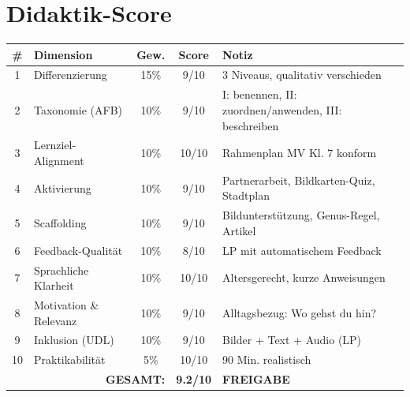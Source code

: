 \documentclass[11pt,a4paper]{article}
\begin{document}
\newpage
\section*{Didaktik-Score}

\begin{center}
\begin{tabular}{|c|l|c|c|p{5cm}|}
\hline
\textbf{\#} & \textbf{Dimension} & \textbf{Gew.} & \textbf{Score} & \textbf{Notiz} \\
\hline
1 & Differenzierung & 15\% & 9/10 & 3 Niveaus, qualitativ verschieden \\
\hline
2 & Taxonomie (AFB) & 10\% & 9/10 & I: benennen, II: zuordnen/anwenden, III: beschreiben \\
\hline
3 & Lernziel-Alignment & 10\% & 10/10 & Rahmenplan MV Kl. 7 konform \\
\hline
4 & Aktivierung & 10\% & 9/10 & Partnerarbeit, Bildkarten-Quiz, Stadtplan \\
\hline
5 & Scaffolding & 10\% & 9/10 & Bildunterstützung, Genus-Regel, Artikel \\
\hline
6 & Feedback-Qualität & 10\% & 8/10 & LP mit automatischem Feedback \\
\hline
7 & Sprachliche Klarheit & 10\% & 10/10 & Altersgerecht, kurze Anweisungen \\
\hline
8 & Motivation \& Relevanz & 10\% & 9/10 & Alltagsbezug: Wo gehst du hin? \\
\hline
9 & Inklusion (UDL) & 10\% & 9/10 & Bilder + Text + Audio (LP) \\
\hline
10 & Praktikabilität & 5\% & 10/10 & 90 Min. realistisch \\
\hline
\multicolumn{3}{|r|}{\textbf{GESAMT:}} & \textbf{9.2/10} & \textcolor{basis}{\textbf{FREIGABE}} \\
\hline
\end{tabular}
\end{center}
\end{document}

